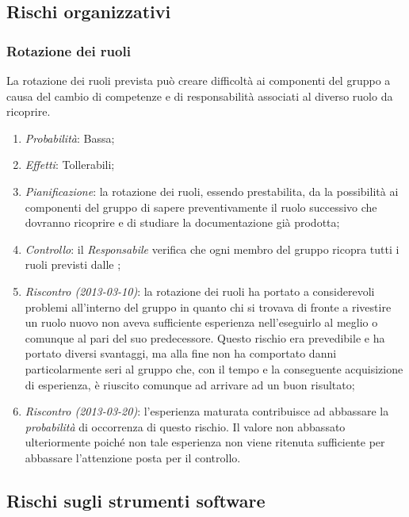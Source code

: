 	\subsection{Rischi organizzativi}
	
		\subsubsection{Rotazione dei ruoli}

La rotazione dei ruoli prevista può creare difficoltà ai componenti del gruppo a causa del cambio di competenze e di responsabilità associati al diverso ruolo da ricoprire.

\begin{enumerate}
\item \textit{Probabilità}: Bassa;
\item \textit{Effetti}: Tollerabili;
\item \textit{Pianificazione}: la rotazione dei ruoli, essendo prestabilita, da la possibilità ai componenti del gruppo di sapere preventivamente il ruolo successivo che dovranno ricoprire e di studiare la documentazione già prodotta;
\item \textit{Controllo}: il \emph{Responsabile} verifica che ogni membro del gruppo ricopra tutti i ruoli previsti dalle \NormeDiProgetto{};
\item \textit{Riscontro (2013-03-10)}: la rotazione dei ruoli ha portato a considerevoli problemi all'interno del gruppo in quanto chi si trovava di fronte a rivestire un ruolo nuovo non aveva sufficiente esperienza nell'eseguirlo al meglio o comunque al pari del suo predecessore. Questo rischio era prevedibile e ha portato diversi svantaggi, ma alla fine non ha comportato danni particolarmente seri al gruppo che, con il tempo e la conseguente acquisizione di esperienza, è riuscito comunque ad arrivare ad un buon risultato;
\item \textit{Riscontro (2013-03-20)}: l'esperienza maturata contribuisce ad abbassare la \emph{probabilità} di occorrenza di questo rischio. Il valore non abbassato ulteriormente poiché non tale esperienza non viene ritenuta sufficiente per abbassare l'attenzione posta per il controllo.
\end{enumerate}
	
	\subsection{Rischi sugli strumenti software}
	
